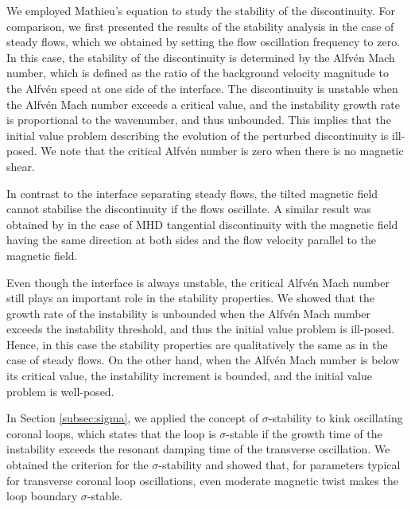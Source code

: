 We employed Mathieu's equation to study the stability of the discontinuity.
For comparison, we first presented the results of the stability analysis in the case of steady flows, which we obtained by setting the flow oscillation frequency to zero.
In this case, the stability of the discontinuity is determined by the Alfv\'en Mach number, which is defined as the ratio of the background velocity magnitude to the Alfv\'en speed at one side of the interface.
The discontinuity is unstable when the Alfv\'en Mach number exceeds a critical value, and the instability growth rate is proportional to the wavenumber, and thus unbounded.
This implies that the initial value problem describing the evolution of the perturbed discontinuity is ill-posed.
We note that the critical Alfv\'en number is zero when there is no magnetic shear. 

In contrast to the interface separating steady flows, the tilted magnetic field cannot stabilise the discontinuity if the flows oscillate. A similar result was obtained by \cite{Roberts1973} in the case of MHD tangential discontinuity with the magnetic field having the same direction at both sides and the flow velocity parallel to the magnetic field.

Even though the interface is always unstable, the critical Alfv\'en Mach number still plays an important role in the stability properties.
We showed that the growth rate of the instability is unbounded when the Alfv\'en Mach number exceeds the instability threshold, and thus the initial value problem is ill-posed.
Hence, in this case the stability properties are qualitatively the same as in the case of steady flows.
On the other hand, when the Alfv\'en Mach number is below its critical value, the instability increment is bounded, and the initial value problem is well-posed.

In Section \ref{subsec:sigma}, we applied the concept of $\sigma$-stability to kink oscillating coronal loops, which states that the loop is $\sigma$-stable if the growth time of the instability exceeds the resonant damping time of the transverse oscillation.
We obtained the criterion for the $\sigma$-stability and showed that, for parameters typical for transverse coronal loop oscillations, even moderate magnetic twist makes the loop boundary $\sigma$-stable.

